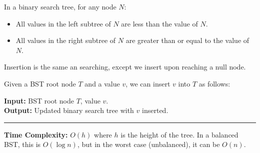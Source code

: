 \begin{theo}

    \label{theo:bst_property}

    In a binary search tree, for any node $N$:
    \begin{itemize}
        \item All values in the left subtree of $N$ are less than the value of $N$.
        \item All values in the right subtree of $N$ are greater than or equal to the value of $N$.
    \end{itemize}
\end{theo}

\newpage 
\noindent
Insertion is the same an searching, except we insert upon reaching a null node.
\begin{Func}

    Given a BST root node $T$ and a value $v$, we can insert $v$ into $T$ as follows:
    
    \vspace{.5em}
    \noindent
    \textbf{Input:} BST root node $T$, value $v$.\\
    \textbf{Output:} Updated binary search tree with $v$ inserted.
    
    \begin{algorithm}[H]
        \SetAlgoLined
    \end{algorithm}
    \noindent
    \rule{\textwidth}{0.4pt}
    \textbf{Time Complexity:} $O(h)$ where $h$ is the height of the tree. In a balanced BST, this is $O(\log n)$, but in the worst case (unbalanced), it can be $O(n)$.\\
\end{Func}

